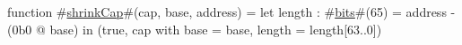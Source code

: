 function #\hyperref[zshrinkCap]{shrinkCap}#(cap, base, address) =
    let length : #\hyperref[zbits]{bits}#(65) = address - (0b0 @ base) in
    (true, {cap with base = base, length = length[63..0]})
